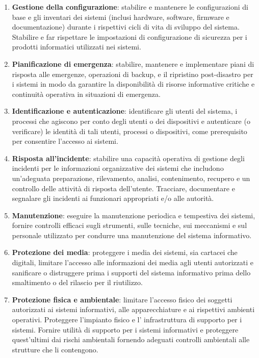 \begin{enumerate}
    \item \textbf{Gestione della configurazione}: stabilire e mantenere le configurazioni di base e gli inventari dei sistemi (inclusi hardware, software, firmware e documentazione) durante i rispettivi cicli di vita di sviluppo del sistema. Stabilire e far rispettare le impostazioni di configurazione di sicurezza per i prodotti informatici utilizzati nei sistemi.
    \item \textbf{Pianificazione di emergenza}: stabilire, mantenere e implementare piani di risposta alle emergenze, operazioni di backup, e il ripristino post-disastro per i sistemi in modo da garantire la disponibilità di risorse informative critiche e continuità operativa in situazioni di emergenza.
    \item \textbf{Identificazione e autenticazione}: identificare gli utenti del sistema, i processi che agiscono per conto degli utenti o dei dispositivi e autenticare (o verificare) le identità di tali utenti, processi o dispositivi, come prerequisito per consentire l'accesso ai sistemi.
    \item \textbf{Risposta all'incidente}: stabilire una capacità operativa di gestione degli incidenti per le informazioni organizzative dei sistemi che includono un'adeguata preparazione, rilevamento, analisi, contenimento, recupero e un controllo delle attività di risposta dell'utente. Tracciare, documentare e segnalare gli incidenti ai funzionari appropriati e/o alle autorità.
    \item \textbf{Manutenzione}: eseguire la manutenzione periodica e tempestiva dei sistemi, fornire controlli efficaci sugli strumenti, sulle tecniche, sui meccanismi e sul personale utilizzato per condurre una manutenzione del sistema informativo.
    \item \textbf{Protezione dei media}: proteggere i media dei sistemi, sia cartacei che digitali, limitare l'accesso alle informazioni dei media agli utenti autorizzati e sanificare o distruggere prima i supporti del sistema informativo prima dello smaltimento o del rilascio per il riutilizzo.
    \item \textbf{Protezione fisica e ambientale}: limitare l'accesso fisico dei soggetti autorizzati ai sistemi informativi, alle apparecchiature e ai rispettivi ambienti operativi. Proteggere l'impianto fisico e l' infrastruttura di supporto per i sistemi. Fornire utilità di supporto per i sistemi informativi e proteggere quest'ultimi dai rischi ambientali fornendo adeguati controlli ambientali alle strutture che li contengono.

\end{enumerate}
